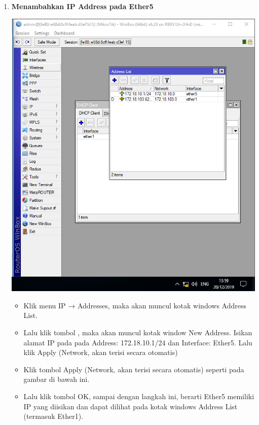 \documentclass[a4paper,12pt]{article}
\begin{document}
\begin{enumerate}[label=\textbf{\arabic*.}]
    \item \textbf{Menambahkan IP Address pada Ether5}
        \begin{center}
            \includegraphics[scale=0.5]{image4.png}
        \end{center}
        \begin{itemize}
            \item Klik menu IP → Addresses, maka akan muncul kotak windows Address List.
            \item Lalu klik tombol , maka akan muncul kotak window New Address. Isikan alamat IP pada pada Address: 172.18.10.1/24 dan Interface: Ether5. Lalu klik Apply (Network, akan terisi secara otomatis)
            \item Klik tombol Apply (Network, akan terisi secara otomatis) seperti pada gambar di bawah ini.
            \item Lalu klik tombol OK, sampai dengan langkah ini, berarti Ether5 memiliki IP yang diisikan dan dapat dilihat pada kotak windows Address List (termasuk Ether1).
        \end{itemize}


\end{enumerate}
\end{document}
